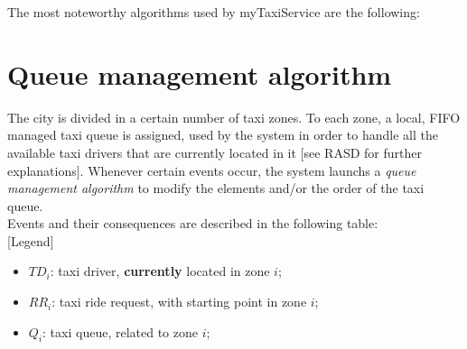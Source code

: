 The most noteworthy algorithms used by myTaxiService are the following:
	
\section{Queue management algorithm}
	The city is divided in a certain number of taxi zones. To each zone, a local, FIFO managed taxi queue is assigned, used by the system in order to handle all the available taxi drivers that are currently located in it [see RASD for further explanations]. Whenever certain events occur, the system launchs a \textit{queue management algorithm} to modify the elements and/or the order of the taxi queue.\\
	Events and their consequences are described in the following table:\\
	
	[Legend]
	\begin{itemize}
		\item $TD_i$: taxi driver, \textbf{currently} located in zone $i$;
		\item $RR_i$: taxi ride request, with starting point in zone $i$;
		\item $Q_i$: taxi queue, related to zone $i$;
	\end{itemize}
	
